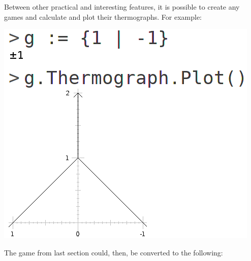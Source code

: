 Between other practical and interesting features, it is possible to create any games and calculate and plot their thermographs. For example:

\begin{center}\includegraphics[scale=0.3]{../images/cgsex1.png}\end{center}

The game from last section could, then, be converted to the following:


